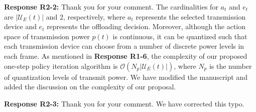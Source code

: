 \documentclass[12pt,onecolumn]{IEEEtran}
\newcommand{\blue}{\color{blue}}
\newcommand{\spaceblank}{\vskip 4mm}
\begin{document}
\spaceblank
{}
\spaceblank
{\blue \textbf{Response R2-2:} Thank you for your comment. The cardinalities for $a_t$ and $e_t$ are $|\mathcal U_E(t)|$ and 2, respectively, where $a_t$ represents the selected transmission device and $e_t$ represents the offloading decision. Moreover, although the action space of transmission power $p(t)$ is continuous, it can be quantized such that each transmission device can choose from a number of discrete power levels in each frame. As mentioned in \textbf{Response R1-6}, the complexity of our proposed one-step policy iteration algorithm is $\mathcal O(N_p|\mathcal U_E(t)|)$, where $N_p$ is the number of quantization levels of transmit power. We have modified the manuscript and added the discussion on the complexity of our proposal.
}


\spaceblank
{}
\spaceblank
{\blue \textbf{Response R2-3:} Thank you for your comment. We have corrected this typo.
}
\end{document}
